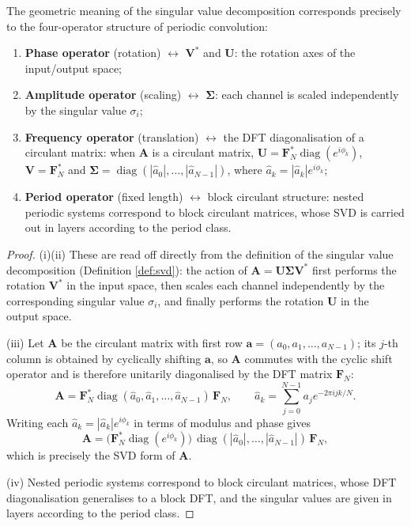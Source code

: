\begin{proposition}\label{prop:svd_periodic_transform}
The geometric meaning of the singular value decomposition corresponds precisely to the four-operator structure of periodic convolution:
\begin{enumerate}[label=(\roman*)]
    \item \textbf{Phase operator} (rotation) $\leftrightarrow$ $\mathbf{V}^*$ and $\mathbf{U}$: the rotation axes of the input/output space;
    \item \textbf{Amplitude operator} (scaling) $\leftrightarrow$ $\boldsymbol{\Sigma}$: each channel is scaled independently by the singular value $\sigma_i$;
    \item \textbf{Frequency operator} (translation) $\leftrightarrow$ the DFT diagonalisation of a circulant matrix: when $\mathbf{A}$ is a circulant matrix, $\mathbf{U} = \mathbf{F}_N^* \operatorname{diag}(e^{i\phi_k})$, $\mathbf{V} = \mathbf{F}_N^*$ and $\boldsymbol{\Sigma} = \operatorname{diag}(|\hat{a}_0|, \dots, |\hat{a}_{N-1}|)$, where $\hat{a}_k = |\hat{a}_k| e^{i\phi_k}$;
    \item \textbf{Period operator} (fixed length) $\leftrightarrow$ block circulant structure: nested periodic systems correspond to block circulant matrices, whose SVD is carried out in layers according to the period class.
\end{enumerate}
\end{proposition}

\begin{proof}
(i)(ii) These are read off directly from the definition of the singular value decomposition (Definition \ref{def:svd}): the action of $\mathbf{A} = \mathbf{U}\boldsymbol{\Sigma}\mathbf{V}^*$ first performs the rotation $\mathbf{V}^*$ in the input space, then scales each channel independently by the corresponding singular value $\sigma_i$, and finally performs the rotation $\mathbf{U}$ in the output space.

(iii) Let $\mathbf{A}$ be the circulant matrix with first row $\mathbf{a} = (a_0, a_1, \dots, a_{N-1})$; its $j$-th column is obtained by cyclically shifting $\mathbf{a}$, so $\mathbf{A}$ commutes with the cyclic shift operator and is therefore unitarily diagonalised by the DFT matrix $\mathbf{F}_N$:
\[
\mathbf{A} = \mathbf{F}_N^* \operatorname{diag}(\hat{a}_0, \hat{a}_1, \dots, \hat{a}_{N-1})\, \mathbf{F}_N, \qquad \hat{a}_k = \sum_{j=0}^{N-1} a_j e^{-2\pi i jk/N}.
\]
Writing each $\hat{a}_k = |\hat{a}_k| e^{i\phi_k}$ in terms of modulus and phase gives
\[
\mathbf{A} = \bigl(\mathbf{F}_N^* \operatorname{diag}(e^{i\phi_k})\bigr)\, \operatorname{diag}(|\hat{a}_0|, \dots, |\hat{a}_{N-1}|)\, \mathbf{F}_N,
\]
which is precisely the SVD form of $\mathbf{A}$.

(iv) Nested periodic systems correspond to block circulant matrices, whose DFT diagonalisation generalises to a block DFT, and the singular values are given in layers according to the period class.
\end{proof}

